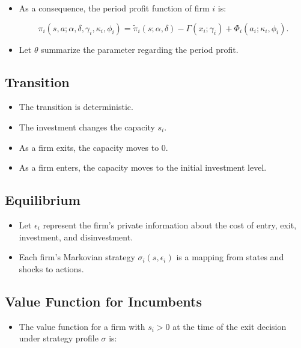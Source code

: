 \documentclass[]{book}
\providecommand{\tightlist}{%
  \setlength{\itemsep}{0pt}\setlength{\parskip}{0pt}}
\begin{document}
\begin{itemize}
\tightlist
\item
  As a consequence, the period profit function of firm \(i\) is:

  \begin{equation}
  \pi_i(s, a; \alpha, \delta, \gamma_i, \kappa_i, \phi_i) = \tilde{\pi}_i(s; \alpha, \delta) - \Gamma(x_i; \gamma_i) + \Phi_i(a_i; \kappa_i, \phi_i).
  \end{equation}
\item
  Let \(\theta\) summarize the parameter regarding the period profit.
\end{itemize}

\subsection{Transition}\label{transition}

\begin{itemize}
\tightlist
\item
  The transition is deterministic.
\item
  The investment changes the capacity \(s_i\).
\item
  As a firm exits, the capacity moves to 0.
\item
  As a firm enters, the capacity moves to the initial investment level.
\end{itemize}

\subsection{Equilibrium}\label{equilibrium}

\begin{itemize}
\tightlist
\item
  Let \(\epsilon_i\) represent the firm's private information about the
  cost of entry, exit, investment, and disinvestment.
\item
  Each firm's Markovian strategy \(\sigma_i(s, \epsilon_i)\) is a
  mapping from states and shocks to actions.
\end{itemize}

\subsection{Value Function for
Incumbents}\label{value-function-for-incumbents}

\begin{itemize}
\tightlist
\item
  The value function for a firm with \(s_i > 0\) at the time of the exit
  decision under strategy profile \(\sigma\) is:
\end{itemize}
\end{document}

